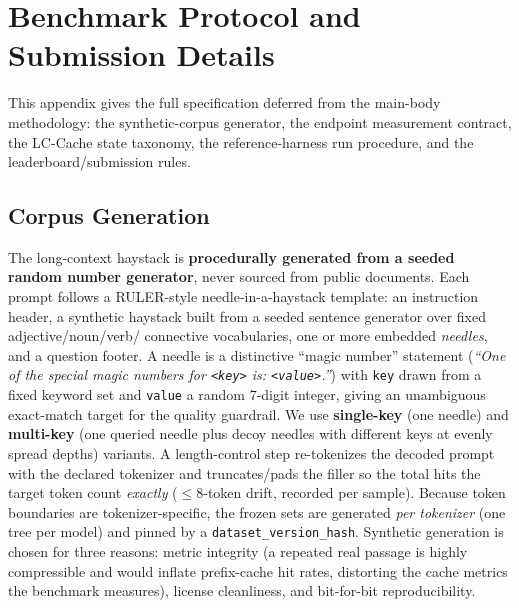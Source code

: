 
\section{Benchmark Protocol and Submission Details}
\label{sec:protocol_appendix}
This appendix gives the full specification deferred from the main-body methodology:
the synthetic-corpus generator, the endpoint measurement contract, the LC-Cache
state taxonomy, the reference-harness run procedure, and the leaderboard/submission
rules.

\subsection{Corpus Generation}
\label{subsec:corpus_details}
The long-context haystack is \textbf{procedurally generated from a seeded random
number generator}, never sourced from public documents. Each prompt follows a
RULER-style needle-in-a-haystack template: an instruction header, a synthetic
haystack built from a seeded sentence generator over fixed adjective/noun/verb/
connective vocabularies, one or more embedded \emph{needles}, and a question
footer. A needle is a distinctive ``magic number'' statement (\emph{``One of the
special magic numbers for \texttt{<key>} is: \texttt{<value>}.''}) with
\texttt{key} drawn from a fixed keyword set and \texttt{value} a random 7-digit
integer, giving an unambiguous exact-match target for the quality guardrail. We use
\textbf{single-key} (one needle) and \textbf{multi-key} (one queried needle plus
decoy needles with different keys at evenly spread depths) variants. A
length-control step re-tokenizes the decoded prompt with the declared tokenizer and
truncates/pads the filler so the total hits the target token count \emph{exactly}
($\leq8$-token drift, recorded per sample). Because token boundaries are
tokenizer-specific, the frozen sets are generated \emph{per tokenizer} (one tree
per model) and pinned by a \texttt{dataset\_version\_hash}. Synthetic generation is
chosen for three reasons: metric integrity (a repeated real passage is highly
compressible and would inflate prefix-cache hit rates, distorting the cache metrics
the benchmark measures), license cleanliness, and bit-for-bit reproducibility.

